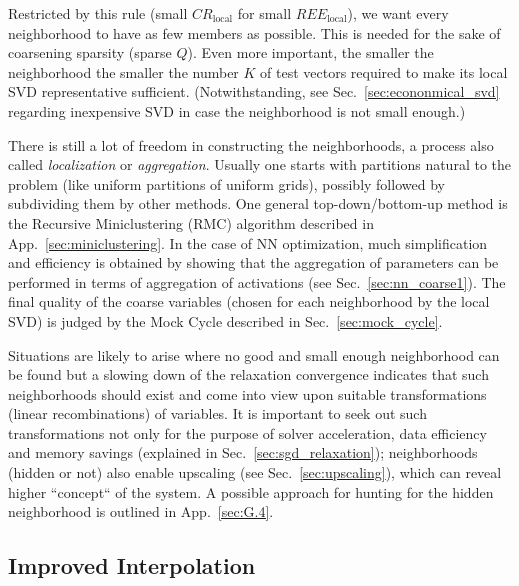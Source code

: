 \documentclass{article} %
\begin{document}
Restricted by this rule (small $CR_{\text{local}}$ for small $REE_{\text{local}}$), we want every neighborhood to have as few members as possible. This is needed for the sake of coarsening sparsity (sparse $Q$). Even more important, the smaller the neighborhood the smaller the number $K$ of test vectors required to make its local SVD representative sufficient. (Notwithstanding, see Sec.~\ref{sec:econonmical_svd} regarding inexpensive SVD in case the neighborhood is not small enough.)

There is still a lot of freedom in constructing the neighborhoods, a process also called {\it localization} or {\it aggregation}. Usually one starts with partitions natural to the problem (like uniform partitions of uniform grids), possibly followed by subdividing them by other methods. One general top-down/bottom-up method is the Recursive Miniclustering (RMC) algorithm described in App.~\ref{sec:miniclustering}. In the case of NN optimization, much simplification and efficiency is obtained by showing that the aggregation of parameters can be performed in terms of aggregation of activations (see Sec.~\ref{sec:nn_coarse1}). The final quality of the coarse variables (chosen for each neighborhood by the local SVD) is judged by the Mock Cycle described in Sec.~\ref{sec:mock_cycle}.

Situations are likely to arise where no good and small enough neighborhood can be found but a slowing down of the relaxation convergence indicates that such neighborhoods should exist and come into view upon suitable transformations (linear recombinations) of variables. It is important to seek out such transformations not only for the purpose of solver acceleration, data efficiency and memory savings (explained in Sec.~\ref{sec:sgd_relaxation}); neighborhoods (hidden or not) also enable upscaling (see Sec.~\ref{sec:upscaling}), which can reveal higher ``concept`` of the system. A possible approach for hunting for the hidden neighborhood is outlined in App.~\ref{sec:G.4}.

\subsection{Improved Interpolation}
\label{sec:improved_coarsening}
\end{document}
